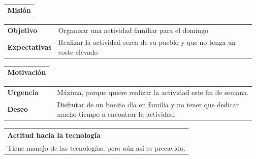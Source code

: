 \documentclass[11pt]{article}
\begin{document}
\begin{table}[H]
  \begin{tabular}{l}
    \textbf{Misión} 
  \end{tabular}
  
  \begin{tabular}{p{0.2\linewidth}|p{0.8\linewidth}}
    \toprule
    \textbf{Objetivo} & Organizar una actividad familiar para el domingo\\
    \textbf{Expectativas}  & Realizar la actividad cerca de su pueblo y que no tenga un coste elevado \\
    \bottomrule
  \end{tabular}

  \begin{tabular}{l}
    \textbf{Motivación} 
  \end{tabular}

  \begin{tabular}{p{0.2\linewidth}|p{0.8\linewidth}}
    \toprule
    \textbf{Urgencia} & Máxima, porque quiere realizar la actividad este fin de semana.\\
    \textbf{Deseo}  & Disfrutar de un bonito día en familia y no tener que dedicar mucho tiempo a encontrar la actividad.\\
    \bottomrule
  \end{tabular}

  \begin{tabular}{p{1.028\linewidth}}
    \textbf{Actitud hacia la tecnología}\\
    \midrule
    Tiene manejo de las tecnologías, pero aún así es precavida.  
  \end{tabular}
\end{table}
\end{document}
